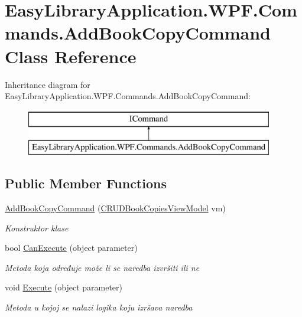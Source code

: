 \hypertarget{class_easy_library_application_1_1_w_p_f_1_1_commands_1_1_add_book_copy_command}{}\section{Easy\+Library\+Application.\+W\+P\+F.\+Commands.\+Add\+Book\+Copy\+Command Class Reference}
\label{class_easy_library_application_1_1_w_p_f_1_1_commands_1_1_add_book_copy_command}
Inheritance diagram for Easy\+Library\+Application.\+W\+P\+F.\+Commands.\+Add\+Book\+Copy\+Command\+:\begin{figure}[H]
\begin{center}
\leavevmode
\includegraphics[height=2.000000cm]{class_easy_library_application_1_1_w_p_f_1_1_commands_1_1_add_book_copy_command}
\end{center}
\end{figure}
\subsection*{Public Member Functions}
\begin{DoxyCompactItemize}
\item 
\mbox{\hyperlink{class_easy_library_application_1_1_w_p_f_1_1_commands_1_1_add_book_copy_command_ab4539655db9dbd4dab97cf713151ce40}{Add\+Book\+Copy\+Command}} (\mbox{\hyperlink{class_easy_library_application_1_1_w_p_f_1_1_view_model_1_1_c_r_u_d_book_copies_view_model}{C\+R\+U\+D\+Book\+Copies\+View\+Model}} vm)
\begin{DoxyCompactList}\small\item\em Konstruktor klase \end{DoxyCompactList}\item 
bool \mbox{\hyperlink{class_easy_library_application_1_1_w_p_f_1_1_commands_1_1_add_book_copy_command_acea42f644f330df3f72d0235acb202c6}{Can\+Execute}} (object parameter)
\begin{DoxyCompactList}\small\item\em Metoda koja određuje može li se naredba izvršiti ili ne \end{DoxyCompactList}\item 
void \mbox{\hyperlink{class_easy_library_application_1_1_w_p_f_1_1_commands_1_1_add_book_copy_command_a00b9a765b378139d7e270c2ea54a61a6}{Execute}} (object parameter)
\begin{DoxyCompactList}\small\item\em Metoda u kojoj se nalazi logika koju izršava naredba \end{DoxyCompactList}\end{DoxyCompactItemize}
